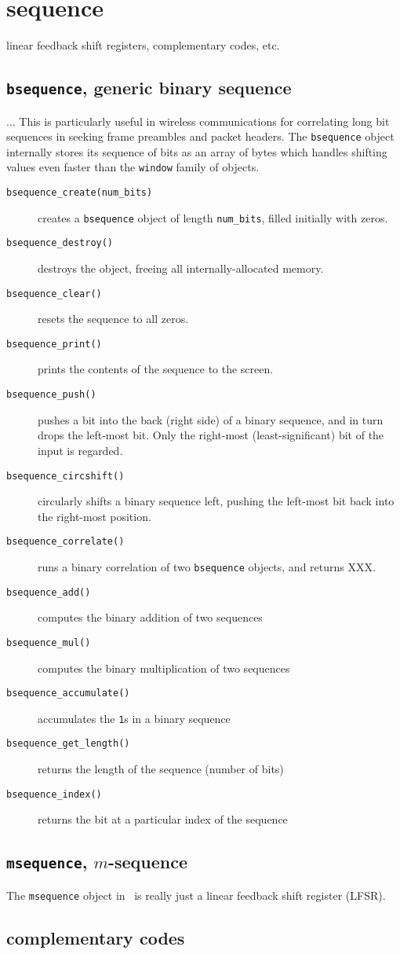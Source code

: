 % 
%

\section{sequence}
\label{module:sequence}
linear feedback shift registers, complementary codes, etc.

\subsection{{\tt bsequence}, generic binary sequence}
\label{module:sequence:bsequence}
...
This is particularly useful in wireless communications for correlating long
bit sequences in seeking frame preambles and packet headers.
The {\tt bsequence} object internally stores its sequence of bits as an array
of bytes which handles shifting values even faster than the {\tt window}
family of objects.

\begin{description}
\item[{\tt bsequence\_create(num\_bits)}]
    creates a {\tt bsequence} object of length {\tt num\_bits}, filled
    initially with zeros.
\item[{\tt bsequence\_destroy()}]
    destroys the object, freeing all internally-allocated memory.
\item[{\tt bsequence\_clear()}]
    resets the sequence to all zeros.
\item[{\tt bsequence\_print()}]
    prints the contents of the sequence to the screen.
\item[{\tt bsequence\_push()}]
    pushes a bit into the back (right side) of a binary sequence, and in turn
    drops the left-most bit.
    Only the right-most (least-significant) bit of the input is regarded.
\item[{\tt bsequence\_circshift()}]
    circularly shifts a binary sequence left, pushing the left-most bit back
    into the right-most position.
\item[{\tt bsequence\_correlate()}]
    runs a binary correlation of two {\tt bsequence} objects, and returns XXX.
\item[{\tt bsequence\_add()}]
    computes the binary addition of two sequences
\item[{\tt bsequence\_mul()}]
    computes the binary multiplication of two sequences
\item[{\tt bsequence\_accumulate()}]
    accumulates the {\tt 1}s in a binary sequence
\item[{\tt bsequence\_get\_length()}]
    returns the length of the sequence (number of bits)
\item[{\tt bsequence\_index()}]
    returns the bit at a particular index of the sequence
\end{description}


\subsection{{\tt msequence}, $m$-sequence}
\label{module:sequence:msequence}
The {\tt msequence} object in \liquid\ is really just a linear feedback shift
register (LFSR).


\subsection{complementary codes}
\label{module:sequence:ccodes}


